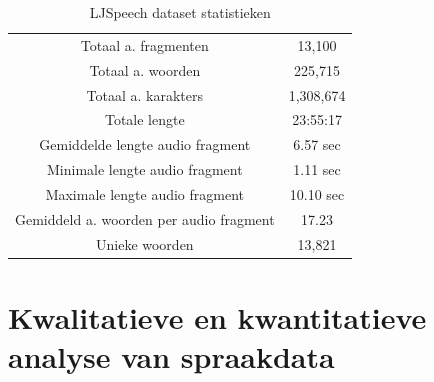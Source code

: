 \begin{table}[H]
    \centering
    \begin{tabular}{c|c}
    Totaal a. fragmenten & 13,100 \\
    Totaal a. woorden & 225,715 \\
    Totaal a. karakters & 1,308,674 \\
    Totale lengte & 23:55:17 \\
    Gemiddelde lengte audio fragment & 6.57 sec \\
    Minimale lengte audio fragment & 1.11 sec \\
    Maximale lengte audio fragment & 10.10 sec \\
    Gemiddeld a. woorden per audio fragment & 17.23 \\
    Unieke woorden & 13,821 \\
    \end{tabular}
    \caption{LJSpeech dataset statistieken}
    \label{tab:ljspeech}
\end{table}






\section{Kwalitatieve en kwantitatieve analyse van spraakdata}


